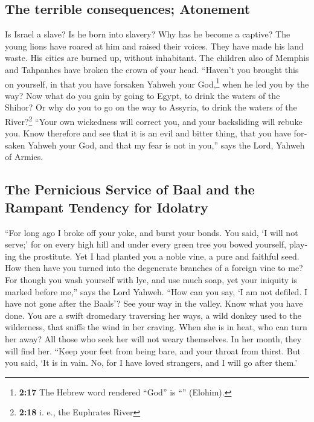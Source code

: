 \begin{paracol}{2}
\begin{otherlanguage}{english}
\hypertarget{the-terrible-consequences-atonement}{%
\subsection{The terrible consequences;
Atonement}\label{the-terrible-consequences-atonement}}

 Is Israel a slave? Is he born into slavery? Why has he
become a captive?  The young lions have roared at him and
raised their voices. They have made his land waste. His cities are
burned up, without inhabitant.  The children also of
Memphis and Tahpanhes have broken the crown of your head.
 ``Haven't you brought this on yourself, in that you have
forsaken Yahweh your God,\footnote{\textbf{2:17} The Hebrew word
  rendered ``God'' is ``'' (Elohim).} when he led you by
the way?  Now what do you gain by going to Egypt, to
drink the waters of the Shihor? Or why do you to go on the way to
Assyria, to drink the waters of the River?\footnote{\textbf{2:18} i. e.,
  the Euphrates River}  ``Your own wickedness will
correct you, and your backsliding will rebuke you. Know therefore and
see that it is an evil and bitter thing, that you have forsaken Yahweh
your God, and that my fear is not in you,'' says the Lord, Yahweh of
Armies.

\hypertarget{the-pernicious-service-of-baal-and-the-rampant-tendency-for-idolatry}{%
\subsection{The Pernicious Service of Baal and the Rampant Tendency for
Idolatry}\label{the-pernicious-service-of-baal-and-the-rampant-tendency-for-idolatry}}

 ``For long ago I broke off your yoke, and burst your
bonds. You said, `I will not serve;' for on every high hill and under
every green tree you bowed yourself, playing the prostitute.
 Yet I had planted you a noble vine, a pure and faithful
seed. How then have you turned into the degenerate branches of a foreign
vine to me?  For though you wash yourself with lye, and
use much soap, yet your iniquity is marked before me,'' says the Lord
Yahweh.  ``How can you say, `I am not defiled. I have not
gone after the Baals'? See your way in the valley. Know what you have
done. You are a swift dromedary traversing her ways,  a
wild donkey used to the wilderness, that sniffs the wind in her craving.
When she is in heat, who can turn her away? All those who seek her will
not weary themselves. In her month, they will find her. 
``Keep your feet from being bare, and your throat from thirst. But you
said, `It is in vain. No, for I have loved strangers, and I will go
after them.'


\end{otherlanguage}
\end{paracol}
